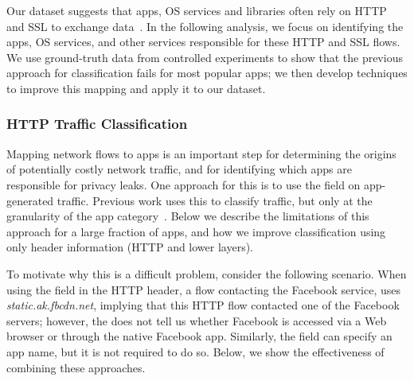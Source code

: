 Our \mobWild dataset suggests that apps, OS services and libraries often rely on HTTP and SSL to exchange data~\cite{maier:mobtraffic,falaki:mobileusage,xu:appusage}.
In the following analysis, we focus on identifying the apps, OS services, and other services responsible for these HTTP and SSL flows. 
We use ground-truth data from controlled experiments to show that the previous approach for classification fails 
for most popular apps; we then develop techniques to improve this mapping and apply it to our \mobWild dataset. 

\subsubsection{HTTP Traffic Classification}

Mapping network flows to apps is an important step for determining the origins of potentially costly 
network traffic, and for identifying which apps are responsible for privacy leaks. One approach for this is to use the \useragent field on app-generated traffic.
Previous work uses this to classify traffic, but only at the granularity of the app category~\cite{erman2011http,xu:appusage,maier:mobtraffic}. 
Below we describe the limitations of this approach for a large fraction of apps, and how we improve classification using only header information (\ie HTTP and lower layers). 

To motivate why this is a difficult problem, consider the following scenario. When using the \httphost field in the HTTP header, a flow contacting the Facebook service, uses \emph{static.ak.fbcdn.net}, implying that this HTTP flow contacted one of the Facebook servers; however, the \httphost does not tell us whether Facebook is accessed via a Web browser or through the native Facebook app. Similarly, the \useragent field can specify an app name, but it is not required to do so. Below, we show the effectiveness of combining these approaches. 



